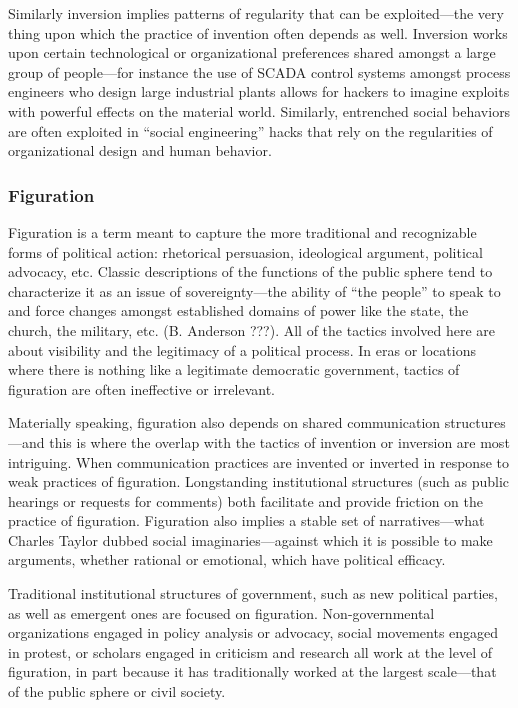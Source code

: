 \documentclass[10pt,letter,oneside]{scrartcl}
\begin{document}
Similarly inversion implies patterns of regularity that can be exploited---the
very thing upon which the practice of invention often depends as well.
Inversion works upon certain technological or organizational preferences shared
amongst a large group of people---for instance the use of SCADA control systems
amongst process engineers who design large industrial plants allows for hackers
to imagine exploits with powerful effects on the material world.  Similarly,
entrenched social behaviors are often exploited in ``social engineering'' hacks
that rely on the regularities of organizational design and human behavior.

\subsubsection{Figuration}

Figuration is a term meant to capture the more traditional and recognizable
forms of political action: rhetorical persuasion, ideological argument,
political advocacy, etc.  Classic descriptions of the functions of the public
sphere tend to characterize it as an issue of sovereignty---the ability of ``the
people'' to speak to and force changes amongst established domains of power like
the state, the church, the military, etc. (B. Anderson ???).  All of the tactics
involved here are about visibility and the legitimacy of a political process.
In eras or locations where there is nothing like a legitimate democratic
government, tactics of figuration are often ineffective or irrelevant.

Materially speaking, figuration also depends on shared communication
structures---and this is where the overlap with the tactics of invention or
inversion are most intriguing.  When communication practices are invented or
inverted in response to weak practices of figuration.  Longstanding
institutional structures (such as public hearings or requests for comments) both
facilitate and provide friction on the practice of figuration.  Figuration also
implies a stable set of narratives---what Charles Taylor dubbed social
imaginaries---against which it is possible to make arguments, whether rational
or emotional, which have political efficacy.

Traditional institutional structures of government, such as new political
parties, as well as emergent ones are focused on figuration. Non-governmental
organizations engaged in policy analysis or advocacy, social movements engaged
in protest, or scholars engaged in criticism and research all work at the level
of figuration, in part because it has traditionally worked at the largest
scale—that of the public sphere or civil society.
\end{document}
